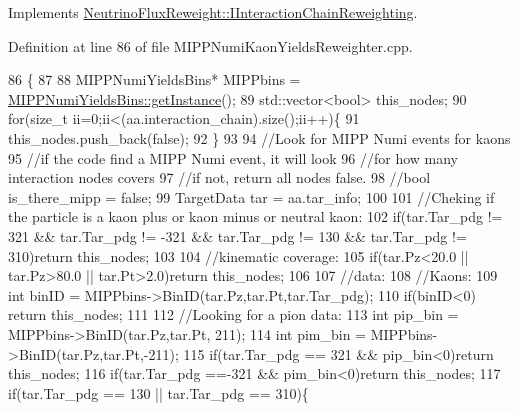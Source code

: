 Implements \hyperlink{class_neutrino_flux_reweight_1_1_i_interaction_chain_reweighting_aacf17580c1d316f0ebcdfdff7418e9e3}{Neutrino\-Flux\-Reweight\-::\-I\-Interaction\-Chain\-Reweighting}.



Definition at line 86 of file M\-I\-P\-P\-Numi\-Kaon\-Yields\-Reweighter.\-cpp.


\begin{DoxyCode}
86                                                                                          \{
87     
88     MIPPNumiYieldsBins*  MIPPbins =  \hyperlink{class_neutrino_flux_reweight_1_1_m_i_p_p_numi_yields_bins_a7f44afe90a846812d6eabfafa8f576e4}{MIPPNumiYieldsBins::getInstance}();
89     std::vector<bool> this\_nodes;
90     \textcolor{keywordflow}{for}(\textcolor{keywordtype}{size\_t} ii=0;ii<(aa.interaction\_chain).size();ii++)\{
91       this\_nodes.push\_back(\textcolor{keyword}{false});
92     \}
93     
94     \textcolor{comment}{//Look for MIPP Numi events for kaons}
95     \textcolor{comment}{//if the code find a MIPP Numi event, it will look }
96     \textcolor{comment}{//for how many interaction nodes covers}
97     \textcolor{comment}{//if not, return all nodes false.}
98     \textcolor{comment}{//bool is\_there\_mipp = false;   }
99     TargetData tar = aa.tar\_info;
100     
101     \textcolor{comment}{//Cheking if the particle is a kaon plus or kaon minus or neutral kaon:}
102     \textcolor{keywordflow}{if}(tar.Tar\_pdg != 321 && tar.Tar\_pdg != -321 && tar.Tar\_pdg != 130 && tar.Tar\_pdg != 310)\textcolor{keywordflow}{return} 
      this\_nodes;
103 
104     \textcolor{comment}{//kinematic coverage:}
105     \textcolor{keywordflow}{if}(tar.Pz<20.0 || tar.Pz>80.0 || tar.Pt>2.0)\textcolor{keywordflow}{return} this\_nodes;
106 
107     \textcolor{comment}{//data:}
108     \textcolor{comment}{//Kaons:}
109     \textcolor{keywordtype}{int} binID = MIPPbins->BinID(tar.Pz,tar.Pt,tar.Tar\_pdg);
110     \textcolor{keywordflow}{if}(binID<0) \textcolor{keywordflow}{return} this\_nodes;
111 
112     \textcolor{comment}{//Looking for a pion data:}
113     \textcolor{keywordtype}{int} pip\_bin = MIPPbins->BinID(tar.Pz,tar.Pt, 211);
114     \textcolor{keywordtype}{int} pim\_bin = MIPPbins->BinID(tar.Pz,tar.Pt,-211);
115     \textcolor{keywordflow}{if}(tar.Tar\_pdg == 321 && pip\_bin<0)\textcolor{keywordflow}{return} this\_nodes;
116     \textcolor{keywordflow}{if}(tar.Tar\_pdg ==-321 && pim\_bin<0)\textcolor{keywordflow}{return} this\_nodes;
117     \textcolor{keywordflow}{if}(tar.Tar\_pdg == 130 || tar.Tar\_pdg == 310)\{

\end{DoxyCode}
